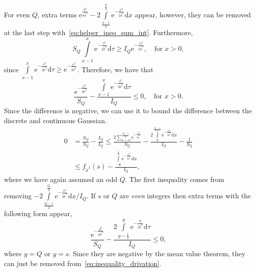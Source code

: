 \documentclass[journal, twoside, web]{ieeecolorpreprint}
\begin{document}
    For even $Q$, extra terms $\mathrm{e}^{\frac{q^2}{8\tilde \sigma^2}}-2\int \limits_{\frac{q-1}{2}}^{\frac{q}{2}} \mathrm{e}^{-\frac{x^2}{2\tilde \sigma^2}}\mathrm{d}x$ appear, however, they can be removed at the last step with~\eqref{eq:helper_ineq_sum_int}. Furthermore,
    \begin{equation*}
        S_Q\int \limits_{x-1}^{x} \mathrm{e}^{-\frac{\tau^2}{2\tilde \sigma^2}}\mathrm{d}\tau \geq I_Q \mathrm{e}^{-\frac{x^2}{2 \tilde \sigma^2}}, \quad \text{for } x>0,
    \end{equation*}
    since $\int \limits_{x-1}^{x} \mathrm{e}^{-\frac{\tau^2}{2\tilde \sigma^2}}\mathrm{d}\tau \geq \mathrm{e}^{-\frac{x^2}{2 \tilde \sigma^2}}$. Therefore, we have that
    \begin{equation*}
        \frac{\mathrm{e}^{-\frac{x^2}{2 \tilde \sigma^2}}}{S_Q}-\frac{\int \limits_{x-1}^{x} \mathrm{e}^{-\frac{\tau^2}{2\tilde \sigma^2}} \mathrm{d} \tau}{I_Q} \leq 0, \quad \text{for } x>0.
    \end{equation*}
Since the difference is negative, we can use it to bound the difference between the discrete and continuous Gaussian.
\begin{equation} \label{eq:inequality_drivation}
    \begin{aligned}
        0 & = \frac{S_Q}{S_Q}-\frac{I_Q}{I_Q} \leq \frac{2\sum \limits_{x = 0}^{\frac{Q-1}{2}} \mathrm{e}^{-\frac{x^2}{2 \tilde \sigma^2}}}{S_Q} - \frac{2\int \limits_{0}^{\frac{Q-1}{2}} \mathrm{e}^{-\frac{x^2}{2\tilde \sigma^2}} \mathrm{d}x}{I_Q} - \frac{1}{S_Q} \\
        & \leq f_{\tilde \sigma^2}(s) - \frac{\int \limits_{-\frac{s}{2}}^{\frac{s}{2}} \mathrm{e}^{-\frac{x^2}{2\tilde \sigma^2}} \mathrm{d}x}{I_Q}, %
    \end{aligned}
    \end{equation}
    where we have again assumed an odd $Q$. The first inequality comes from removing $-2\int \limits_{\frac{Q-1}{2}}^{\frac{Q}{2}} \mathrm{e}^{-\frac{x^2}{2\tilde \sigma^2}} \mathrm{d}x/I_Q$. If $s$ or $Q$ are \emph{even} integers then extra terms with the following form appear,
    \begin{equation*}
        \frac{\mathrm{e}^{-\frac{y^2}{2 \tilde \sigma^2}}}{S_Q} - \frac{2\int \limits_{y-\frac{1}{2}}^{y} \mathrm{e}^{-\frac{\tau^2}{2\tilde \sigma^2}} \mathrm{d}\tau}{I_Q} \leq 0,
    \end{equation*}
    where $y=Q$ or $y=s$. Since they are negative by the mean value theorem, they can just be removed from~\eqref{eq:inequality_drivation}. 
    
\end{document}

